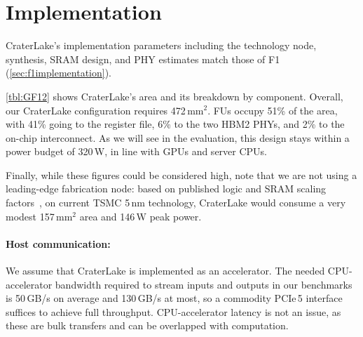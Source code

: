 \section{Implementation}\label{sec:implementation}

\tblGF

CraterLake's implementation parameters including the technology node,
synthesis, SRAM design, and PHY estimates match those of F1
(\autoref{sec:f1implementation}).

\autoref{tbl:GF12} shows CraterLake's area and its breakdown by component.
Overall, our CraterLake configuration requires 472\,mm$^2$. FUs occupy 51\% of
the area, with 41\% going to the register file, 6\% to the two HBM2 PHYs, and
2\% to the on-chip interconnect. As we will see in the evaluation, this design
stays within a power budget of 320\,W, in line with GPUs and server CPUs.

Finally, while these figures could be considered high, note that we are not
using a leading-edge fabrication node: based on published logic and SRAM
scaling factors~\cite{yeap:iedm19:tsmc-n5}, on current TSMC 5\,nm technology,
CraterLake would consume a very modest 157\,mm$^\textrm{2}$ area and 146\,W
peak power.

\paragraph{Host communication:}
We assume that CraterLake is implemented as an accelerator. The needed
CPU-accelerator bandwidth required to stream inputs and outputs in our
benchmarks is 50\,GB/s on average and 130\,GB/s at most, so a commodity PCIe\,5
interface suffices to achieve full throughput. CPU-accelerator latency is not
an issue, as these are bulk transfers and can be overlapped with computation.

